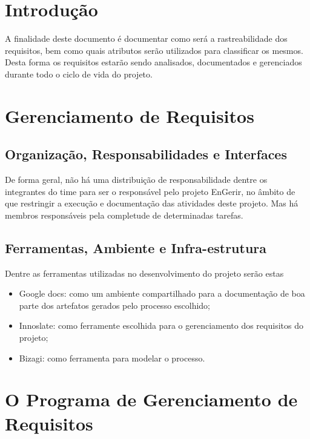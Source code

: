 \begin{apendicesenv}
\section{Introdução}

A finalidade deste documento é documentar como será a rastreabilidade dos requisitos, bem como quais atributos serão utilizados para classificar os mesmos. Desta forma os requisitos estarão sendo analisados, documentados e gerenciados durante todo o ciclo de vida do projeto.

\section{Gerenciamento de Requisitos}

\subsection{Organização, Responsabilidades e Interfaces}

De forma geral, não há uma distribuição de responsabilidade dentre os integrantes do time para ser o responsável pelo projeto EnGerir, no âmbito de que restringir a execução e documentação das atividades deste projeto. Mas há membros responsáveis pela completude de determinadas tarefas.

\subsection{Ferramentas, Ambiente e Infra-estrutura}

Dentre as ferramentas utilizadas no desenvolvimento do projeto serão estas
\begin{itemize}

\item{Google docs: como um ambiente compartilhado para a documentação de boa parte dos artefatos gerados pelo processo escolhido;}

\item{Innoslate: como ferramente escolhida para o gerenciamento dos requisitos do projeto;}

\item{Bizagi: como ferramenta para modelar o processo.}

\end{itemize}


\section{O Programa de Gerenciamento de Requisitos}


\end{apendicesenv}
